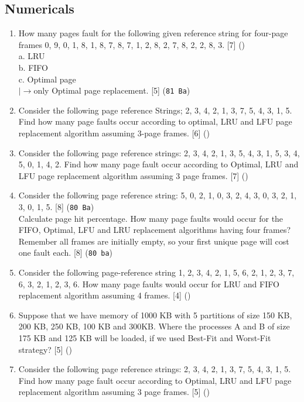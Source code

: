 \documentclass[12pt]{article}
\newcommand{\lb}{\\$\left|\rightarrow\right.$}
\begin{document}
	\subsection{Numericals}
		\begin{enumerate}
			\item How many pages fault for the following given reference string for four-page frames 0, 9, 0, 1, 8, 1, 8, 7, 8, 7, 1, 2, 8, 2, 7, 8, 2, 2, 8, 3. \hfill [7] ()\\
			a. LRU\\
			b. FIFO\\
			c. Optimal page
			\lb only Optimal page replacement. \hfill [5] (\texttt{81 Ba})

			\item Consider the following page reference Strings; 2, 3, 4, 2, 1, 3, 7, 5, 4, 3, 1, 5. Find how many page faults occur according to optimal, LRU and LFU page replacement algorithm assuming 3-page frames. \hfill [6] ()		
			
			\item Consider the following page reference strings: 2, 3, 4, 2, 1, 3, 5, 4, 3, 1, 5, 3, 4, 5, 0, 1, 4, 2. Find how many page fault occur according to Optimal, LRU and LFU page replacement algorithm assuming 3 page frames. \hfill [7] ()

			\item Consider the following page reference string: 5, 0, 2, 1, 0, 3, 2, 4, 3, 0, 3, 2, 1, 3, 0, 1, 5. \hfill [8] (\texttt{80 Ba})\\
			Calculate page hit percentage. How many page faults would occur for the FIFO, Optimal, LFU and LRU replacement algorithms having four frames? Remember all frames are initially empty, so your first unique page will cost one fault each. \hfill [8] (\texttt{80 ba})

			\item Consider the following page-reference string 1, 2, 3, 4, 2, 1, 5, 6, 2, 1, 2, 3, 7, 6, 3, 2, 1, 2, 3, 6. How many page faults would occur for LRU and FIFO replacement algorithm assuming 4 frames. \hfill [4] ()

			\item Suppose that we have memory of 1000 KB with 5 partitions of size 150 KB, 200 KB, 250 KB, 100 KB and 300KB. Where the processes A and B of size 175 KB and 125 KB will be loaded, if we used Best-Fit and Worst-Fit strategy? \hfill [5] ()

			\item Consider the following page reference strings: 2, 3, 4, 2, 1, 3, 7, 5, 4, 3, 1, 5. Find how many page fault occur according to Optimal, LRU and LFU page replacement algorithm assuming 3 page frames. \hfill [5] ()


\end{enumerate}
\end{document}
